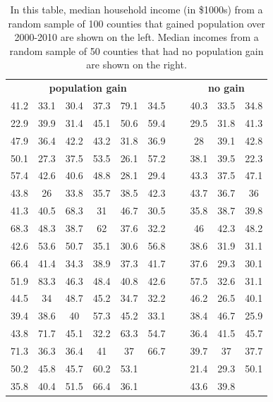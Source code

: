 \begin{table}
\centering
\begin{tabular}{ ccc ccc c ccc }
\multicolumn{6}{c}{\bf population gain} && \multicolumn{3}{c}{\bf no gain} \\
  \cline{1-6} \cline{8-10}
41.2 & 33.1 & 30.4 & 37.3 & 79.1 & 34.5 &\hspace{5mm}\ & 40.3 & 33.5 & 34.8 \\
22.9 & 39.9 & 31.4 & 45.1 & 50.6 & 59.4 && 29.5 & 31.8 & 41.3 \\
47.9 & 36.4 & 42.2 & 43.2 & 31.8 & 36.9 && 28 & 39.1 & 42.8 \\
50.1 & 27.3 & 37.5 & 53.5 & 26.1 & 57.2 && 38.1 & 39.5 & 22.3 \\
57.4 & 42.6 & 40.6 & 48.8 & 28.1 & 29.4 && 43.3 & 37.5 & 47.1 \\
43.8 & 26 & 33.8 & 35.7 & 38.5 & 42.3 && 43.7 & 36.7 & 36 \\
41.3 & 40.5 & 68.3 & 31 & 46.7 & 30.5 && 35.8 & 38.7 & 39.8 \\
68.3 & 48.3 & 38.7 & 62 & 37.6 & 32.2 && 46 & 42.3 & 48.2 \\
42.6 & 53.6 & 50.7 & 35.1 & 30.6 & 56.8 && 38.6 & 31.9 & 31.1 \\
66.4 & 41.4 & 34.3 & 38.9 & 37.3 & 41.7 && 37.6 & 29.3 & 30.1 \\
51.9 & 83.3 & 46.3 & 48.4 & 40.8 & 42.6 && 57.5 & 32.6 & 31.1 \\
44.5 & 34 & 48.7 & 45.2 & 34.7 & 32.2 && 46.2 & 26.5 & 40.1 \\
39.4 & 38.6 & 40 & 57.3 & 45.2 & 33.1 && 38.4 & 46.7 & 25.9 \\
43.8 & 71.7 & 45.1 & 32.2 & 63.3 & 54.7 && 36.4 & 41.5 & 45.7 \\
71.3 & 36.3 & 36.4 & 41 & 37 & 66.7 && 39.7 & 37 & 37.7 \\
50.2 & 45.8 & 45.7 & 60.2 & 53.1 &  && 21.4 & 29.3 & 50.1 \\
35.8 & 40.4 & 51.5 & 66.4 & 36.1 &  && 43.6 & 39.8 &  \\
\cline{1-6} \cline{8-10}
\end{tabular}
\caption{In this table, median household income (in \$1000s) from a random sample of 100 counties that gained population over 2000-2010 are shown on the left. Median incomes from a random sample of 50 counties that had no population gain are shown on the right.}
\label{countyIncomeSplitByPopGainTable}
\end{table}

